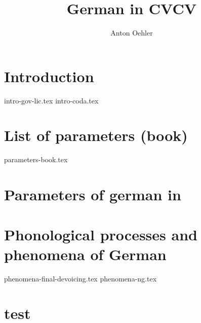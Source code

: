 \documentclass[
]{scrartcl}
\title{German in CVCV}
\author{Anton Oehler}
\begin{document}
\maketitle


\tableofcontents

\section{Introduction}
{intro-gov-lic.tex}
{intro-coda.tex}

\section{List of parameters  (book)}
{parameters-book.tex}
\section{Parameters of german in \CVCV}

\section{Phonological processes and phenomena of German}
{phenomena-final-devoicing.tex}
{phenomena-ng.tex}

\section{test}
 
\begin{structure}
    \wordstart
    \V{\textschwa}
    \fen

\end{structure}

\begin{structure}
    \wordstart
    \emptyV
    \V[floating]{\textschwa}
    \fen

\end{structure}

\begin{structure}
  \wordstart
  \emptyV
  \fen

\end{structure}

\printbibliography
\end{document}
